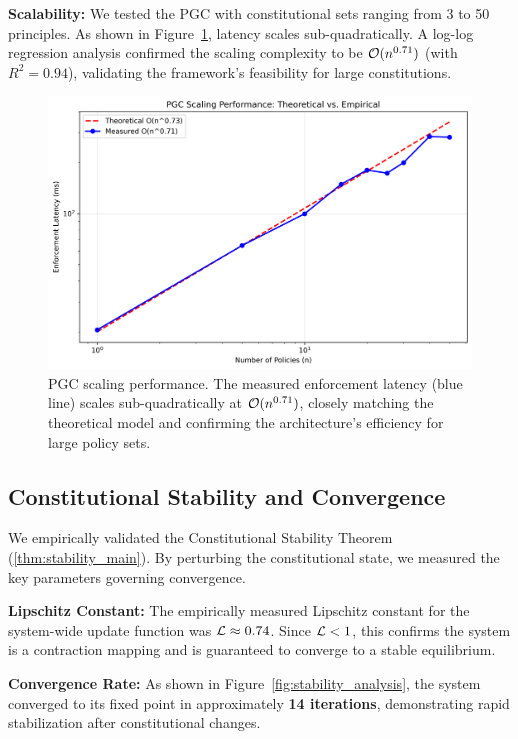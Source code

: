 \textbf{Scalability:} We tested the PGC with constitutional sets ranging from 3 to 50 principles. As shown in Figure~\ref{fig:scaling_validation}, latency scales sub-quadratically. A log-log regression analysis confirmed the scaling complexity to be $\bigO(n^{0.71})$ (with $R^2 = 0.94$), validating the framework's feasibility for large constitutions.

\begin{figure}[H]
    \centering
    \includegraphics[width=\linewidth]{scaling_validation.png}
    \caption{PGC scaling performance. The measured enforcement latency (blue line) scales sub-quadratically at $\bigO(n^{0.71})$, closely matching the theoretical model and confirming the architecture's efficiency for large policy sets.}
    \label{fig:scaling_validation}
\end{figure}

\subsection{Constitutional Stability and Convergence}
We empirically validated the Constitutional Stability Theorem (\ref{thm:stability_main}). By perturbing the constitutional state, we measured the key parameters governing convergence.

\textbf{Lipschitz Constant:} The empirically measured Lipschitz constant for the system-wide update function was $\lipschitz \approx 0.74$. Since $\lipschitz < 1$, this confirms the system is a contraction mapping and is guaranteed to converge to a stable equilibrium.

\textbf{Convergence Rate:} As shown in Figure~\ref{fig:stability_analysis}, the system converged to its fixed point in approximately \textbf{14 iterations}, demonstrating rapid stabilization after constitutional changes.

